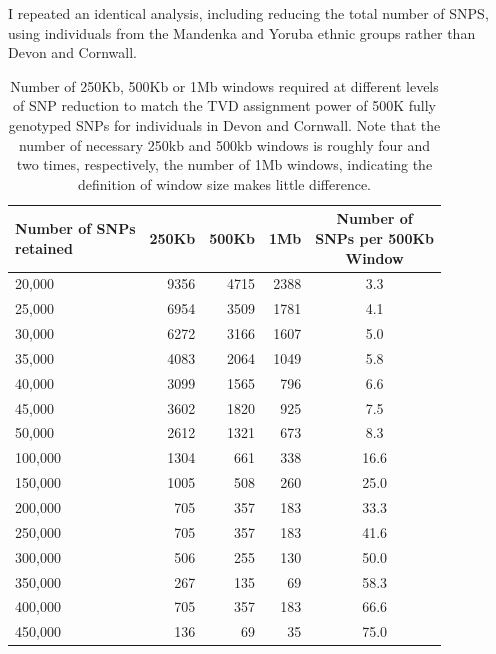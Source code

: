 {I repeated an identical analysis, including reducing the total number of SNPS, using individuals from the Mandenka and Yoruba ethnic groups rather than Devon and Cornwall.  

\begin{table}[!h]
\centering
\begin{tabular}[t]{lrrrc}
\toprule
\thead{Number of SNPs\\ retained} & 250Kb & 500Kb & 1Mb & \thead{Number of\\ SNPs per 500Kb \\Window}\\
\midrule
20,000 & 9356 & 4715 & 2388 & 3.3\\
25,000 & 6954 & 3509 & 1781 & 4.1\\
30,000 & 6272 & 3166 & 1607 & 5.0\\
35,000 & 4083 & 2064 & 1049 & 5.8\\
40,000 & 3099 & 1565 & 796 & 6.6\\
45,000 & 3602 & 1820 & 925 & 7.5\\
50,000 & 2612 & 1321 & 673 & 8.3\\
100,000 & 1304 & 661 & 338 & 16.6\\
150,000 & 1005 & 508 & 260 & 25.0\\
200,000 & 705 & 357 & 183 & 33.3\\
250,000 & 705 & 357 & 183 & 41.6\\
300,000 & 506 & 255 & 130 & 50.0\\
350,000 & 267 & 135 & 69 & 58.3\\
400,000 & 705 & 357 & 183 & 66.6\\
450,000 & 136 & 69 & 35 & 75.0\\
\bottomrule
\end{tabular}
\caption{Number of 250Kb, 500Kb or 1Mb windows required at different levels of SNP reduction to match the TVD assignment power of 500K fully genotyped SNPs for individuals in Devon and Cornwall. Note that the number of necessary 250kb and 500kb windows is roughly four and two times, respectively, the number of 1Mb windows, indicating the definition of window size makes little difference.}
\label{table:windows_power_table_DevCorn}
\end{table}

}
